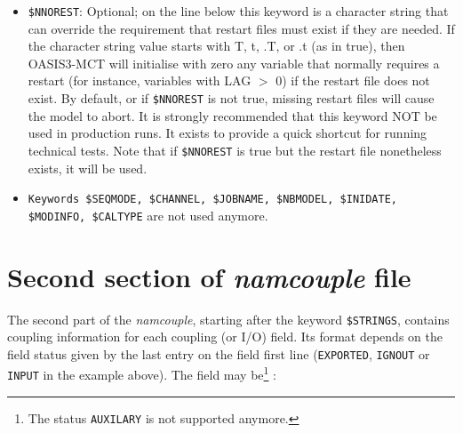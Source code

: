 \begin{itemize}
\item {\tt \$NNOREST}: Optional; on the line below this keyword is a character
  string that can override the requirement that restart files must exist
  if they are needed.  If the character string value starts with T, t, .T,
  or .t (as in true), then OASIS3-MCT will initialise with zero any variable that normally requires
  a restart (for instance, variables with LAG $>$ 0) if the restart file does not exist. By default, or if {\tt \$NNOREST} is not true, missing
  restart files will cause the model to abort.  It is strongly recommended
  that this keyword NOT be used in production runs.  It exists to provide a
  quick shortcut for running technical tests.
  Note that if {\tt \$NNOREST} is true but the restart file nonetheless exists, it will be used.

\item {\tt Keywords \$SEQMODE, \$CHANNEL, \$JOBNAME, \$NBMODEL, \$INIDATE, \$MODINFO, \$CALTYPE} are not used anymore.

\end{itemize}


\section{Second section of {\it namcouple} file }
\label{subsec_namcouplesecond}

The second part of the {\it namcouple}, starting after the keyword
{\tt \$STRINGS}, contains coupling information for each coupling (or
I/O) field.  Its format depends on the field status given by the last
entry on the field first line ({\tt EXPORTED}, {\tt IGNOUT} or {\tt
  INPUT} in the example above). The field may be\footnote{The status {\tt AUXILARY} is not supported anymore.} :

